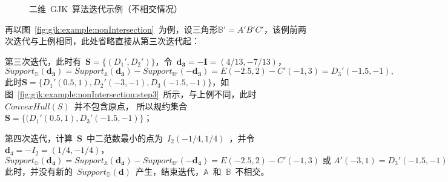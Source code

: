 \begin{figure}[htbp]
\centering
{} 
\caption{二维~GJK~算法迭代示例（不相交情况）}
\label{fig:gjk:example:2d:intersection:iterator}
\end{figure}
再以图~\ref{fig:gjk:example:nonIntersection}~为例，设三角形$\mathbb{B'} = A'B'C'$，该例前两次迭代与上例相同，此处省略直接从第三次迭代起：\\ \indent
\begin{inparaenum}[(1)]
\item 第三次迭代，此时有~$\bm{S} = \{(D_1', D_2') \}$，令~$\bm{d_3}=-\bm{I}=(4/13, -7/13)$，
$ Support_\mathbb{D}(\bm{d_3})   = Support_\mathbb{A}(\bm{d_3}) - Support_\mathbb{B'}(-\bm{d_3}) = E(-2.5, 2) - C'(-1, 3)  = D_3'(-1.5, -1),$
此时$\bm{S} = \{D_1'(0.5, 1), D_2'(-3, -1), D_3(-1.5, -1)\}$，如图~\ref{fig:gjk:example:nonIntersection:step3}~所示，与上例不同，此时~$ConvexHull(S)$~并不包含原点，
所以规约集合~$\bm{S} = \{ (D_1'(0.5, 1), D_3'(-1.5, -1)\}$；\\ \indent
\item 第四次迭代，计算~$\bm{S}$~中二范数最小的点为~$I_2(-1/4, 1/4)$~，并令~$\bm{d}_4 = -I_2 = (1/4, -1/4)$，
$Support_\mathbb{D}(\bm{d_4})   = Support_\mathbb{A}(\bm{d_4}) - Support_\mathbb{B'}(-\bm{d_4}) = E(-2.5, 2) - C'(-1, 3) \textrm{~或~} A'(-3, 1)   = D_3'(-1.5, -1) \textrm{~或~} D_1'(0.5, 1),$
此时，并没有新的~$Support_\mathbb{D}(\bm{d})$~产生，结束迭代，$\mathbb{A}$~和~$\mathbb{B}$~不相交。
\end{inparaenum}

